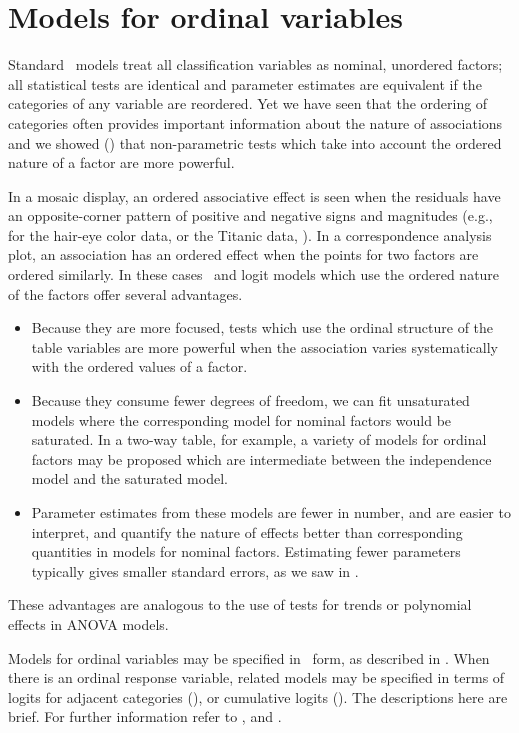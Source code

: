 \section{Models for ordinal variables}\label{sec:loglin-ordinal}
Standard \loglin\ models treat all classification variables as
nominal, unordered factors;
all statistical tests are identical
and parameter estimates are equivalent
if the categories of any variable are reordered.
Yet we have seen that the ordering of categories often provides
important information about the nature of associations
and we showed () that non-parametric
tests which take into account the ordered nature of a factor
are more powerful.

In a mosaic display, an ordered associative effect is seen when
the residuals have an opposite-corner pattern of positive and negative
signs and magnitudes (e.g., for the hair-eye color data,
 or the Titanic data, ).
In a correspondence analysis plot,
an association has an ordered effect when the points for two factors are
ordered similarly.
In these cases \loglin\ and logit models which use the ordered nature of the factors
offer several advantages.
\begin{itemize}
\item Because they are more focused, tests which use the ordinal
structure of the table variables are more powerful when the association
varies systematically with the ordered values of a factor.

\item Because they consume fewer degrees of freedom,
we can fit unsaturated models where the corresponding model for
nominal factors would be saturated.
In a two-way table, for example, a variety of models for ordinal
factors may be proposed which are intermediate between the independence
model and the saturated model.

\item Parameter estimates from these models are fewer in number, and are
easier to interpret, and quantify the nature of effects better
than corresponding quantities in models for nominal factors.
Estimating fewer parameters typically gives smaller standard errors,
as we saw in .
\end{itemize}
These advantages are analogous to the use of tests for trends or
polynomial effects in ANOVA models.

Models for ordinal variables may be specified in \loglin\ form,
as described in .  When there is an ordinal
response variable, related models may be specified in terms of
logits for adjacent categories (),
or cumulative logits ().
The descriptions here are brief. For further information refer to
\citet{Agresti:84}, \citet[Ch. 9]{Agresti:90} and
\citet{Goodman:79,Goodman:83}.

